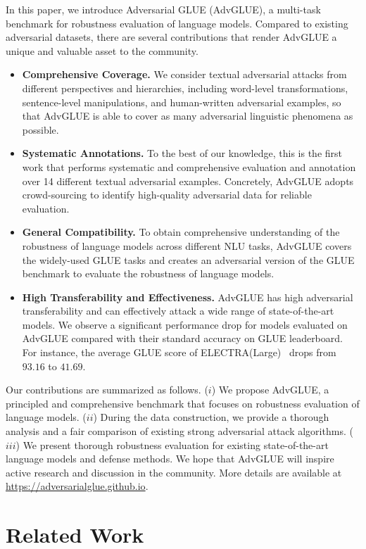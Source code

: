 \documentclass{article}
\newcommand{\method}{AdvGLUE\xspace}
\begin{document}
In this paper, we introduce Adversarial GLUE (\method), a multi-task benchmark for robustness evaluation of language models.
Compared to existing adversarial datasets, there are several contributions that render \method a unique and valuable asset to the community. 
\begin{itemize}[leftmargin=*]
    \item \textbf{Comprehensive Coverage.} We consider textual adversarial attacks from different perspectives and hierarchies, including word-level transformations, sentence-level manipulations, and human-written adversarial examples, so that \method is able to cover as many adversarial linguistic phenomena as possible.
    \item \textbf{Systematic Annotations.} 
    To the best of our knowledge, this is the first work that performs systematic and comprehensive evaluation and annotation over 14 different textual adversarial examples. Concretely, \method adopts  crowd-sourcing to identify high-quality adversarial data for reliable evaluation.
    \item \textbf{General Compatibility.} To obtain comprehensive understanding of the robustness of language models across different NLU tasks, \method covers the widely-used GLUE tasks and creates an adversarial version of the GLUE benchmark to evaluate the robustness of language models.
    \item \textbf{High Transferability and Effectiveness.} \method has high adversarial transferability and can effectively attack a wide range of  state-of-the-art models.  We observe a significant performance drop for models evaluated on \method  compared with their standard accuracy on GLUE leaderboard. For instance, the average GLUE score of ELECTRA(Large)~\cite{clark2020electra} drops from $93.16$ to $41.69$.
\end{itemize}

Our contributions are summarized as follows. ($i$) We propose \method, a principled and comprehensive benchmark  that focuses on  robustness evaluation of language models. ($ii$) During the data construction, we provide a thorough analysis and a fair comparison of existing strong adversarial attack algorithms. ($iii$) We present thorough robustness evaluation for existing state-of-the-art language models and defense methods.
We hope that \method will inspire active research and discussion in the community. More details are available at  \url{https://adversarialglue.github.io}.

\section{Related Work}
\end{document}
